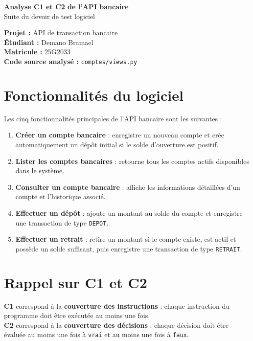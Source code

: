 \documentclass[11pt,a4paper]{article}
\begin{document}
\begin{center}
    {\LARGE\bfseries Analyse C1 et C2 de l'API bancaire}\\[0.3cm]
    {\large Suite du devoir de test logiciel}\\[0.5cm]
\end{center}

\textbf{Projet :} API de transaction bancaire\\
\textbf{Étudiant :} Demano Bramael\\
\textbf{Matricule :} 25G2033\\
\textbf{Code source analysé :} \texttt{comptes/views.py}

\section{Fonctionnalités du logiciel}

Les cinq fonctionnalités principales de l'API bancaire sont les suivantes :

\begin{enumerate}[leftmargin=1.2cm]
    \item \textbf{Créer un compte bancaire} : enregistre un nouveau compte et crée automatiquement un dépôt initial si le solde d'ouverture est positif.
    \item \textbf{Lister les comptes bancaires} : retourne tous les comptes actifs disponibles dans le système.
    \item \textbf{Consulter un compte bancaire} : affiche les informations détaillées d'un compte et l'historique associé.
    \item \textbf{Effectuer un dépôt} : ajoute un montant au solde du compte et enregistre une transaction de type \texttt{DEPOT}.
    \item \textbf{Effectuer un retrait} : retire un montant si le compte existe, est actif et possède un solde suffisant, puis enregistre une transaction de type \texttt{RETRAIT}.
\end{enumerate}

\section{Rappel sur C1 et C2}

\textbf{C1} correspond à la \textbf{couverture des instructions} : chaque instruction du programme doit être exécutée au moins une fois.\\
\textbf{C2} correspond à la \textbf{couverture des décisions} : chaque décision doit être évaluée au moins une fois à \texttt{vrai} et au moins une fois à \texttt{faux}.
\end{document}
